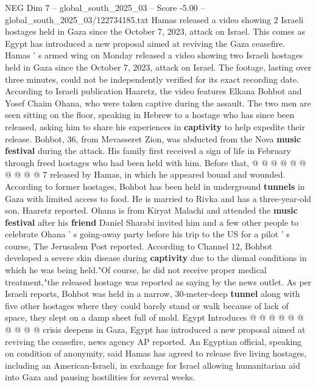 \begin{textsample}{NEG Dim 7 – global\_south\_2025\_03 – Score -5.00 – global\_south\_2025\_03/122734185.txt}  \label{ex:f7_neg_353}
Hamas released a video showing 2 Israeli hostages held in Gaza since the October 7, 2023, attack on Israel.
This comes as Egypt has introduced a new proposal aimed at reviving the Gaza ceasefire.
Hamas ' s armed wing on Monday released a video showing two Israeli hostages held in Gaza since the October 7, 2023, attack on Israel.
The footage, lasting over three minutes, could not be independently verified for its exact recording date.
According to Israeli publication Haaretz, the video features Elkana Bohbot and Yosef Chaim Ohana, who were taken captive during the assault.
The two men are seen sitting on the floor, speaking in Hebrew to a hostage who has since been released, asking him to share his experiences in \textbf{captivity} to help expedite their release.
Bohbot, 36, from Mevasseret Zion, was abducted from the Nova \textbf{music} \textbf{festival} during the attack.
His family first received a sign of life in February through freed hostages who had been held with him.
Before that, @ @ @ @ @ @ @ @ @ @ 7 released by Hamas, in which he appeared bound and wounded.
According to former hostages, Bohbot has been held in underground \textbf{tunnels} in Gaza with limited access to food.
He is married to Rivka and has a three-year-old son, Haaretz reported.
Ohana is from Kiryat Malachi and attended the \textbf{music} \textbf{festival} after his \textbf{friend} Daniel Sharabi invited him and a few other people to celebrate Ohana ' s going-away party before his trip to the US for a pilot ' s course, The Jerusalem Post reported.
According to Channel 12, Bohbot developed a severe skin disease during \textbf{captivity} due to the dismal conditions in which he was being held."Of course, he did not receive proper medical treatment,"the released hostage was reported as saying by the news outlet.
As per Israeli reports, Bohbot was held in a narrow, 30-meter-deep \textbf{tunnel} along with five other hostages where they could barely stand or walk because of lack of space, they slept on a damp sheet full of mold.
Egypt Introduces @ @ @ @ @ @ @ @ @ @ crisis deepens in Gaza, Egypt has introduced a new proposal aimed at reviving the ceasefire, news agency AP reported.
An Egyptian official, speaking on condition of anonymity, said Hamas has agreed to release five living hostages, including an American-Israeli, in exchange for Israel allowing humanitarian aid into Gaza and pausing hostilities for several weeks.

\end{textsample}
